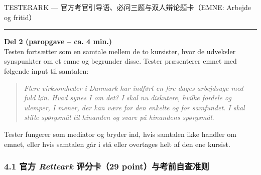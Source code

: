 \begin{emailbox}{TESTERARK --- 官方考官引导语、必问三题与双人辩论题卡（EMNE: Arbejde og fritid）}
\vspace{0.35em}
\hrule
\vspace{0.35em}
\textbf{\color{NCDRed}Del 2 (paropgave -- ca. 4 min.)}\\
Testen fortsætter som en samtale mellem de to kursister, hvor de udveksler synspunkter om et emne og begrunder disse. Tester præsenterer emnet med følgende input til samtalen:
\begin{quote}
\textit{Flere virksomheder i Danmark har indført en fire dages arbejdsuge med fuld løn. Hvad synes I om det? I skal nu diskutere, hvilke fordele og ulemper, I mener, der kan være for den enkelte og for samfundet. I skal stille spørgsmål til hinanden og svare på hinandens spørgsmål.}
\end{quote}
\small\textcolor{NCDGray}{Tester fungerer som mediator og bryder ind, hvis samtalen ikke handler om emnet, eller hvis samtalen går i stå eller overtages helt af den ene kursist.}
\end{emailbox}

\clearpage
{}

\subsubsection*{4.1 官方 \textit{Retteark} 评分卡（29 point）与考前自查准则}

